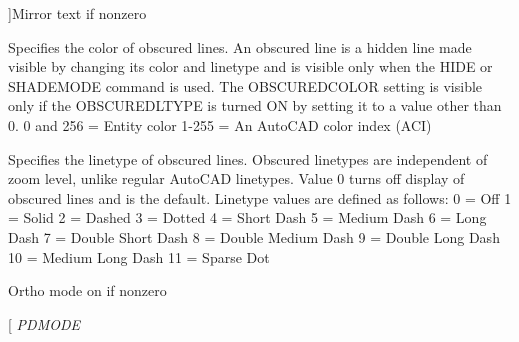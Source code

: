\begin{Desc}
\begin{description}
{}]Mirror text if nonzero \item[{\em 
O\+B\+S\+C\+O\+L\+OR\hypertarget{class_c_a_d_header_abd894aab7aa85b4c4634e67fb93d6886a2d78a3c49c635a923203efc313d1c968}{}\label{class_c_a_d_header_abd894aab7aa85b4c4634e67fb93d6886a2d78a3c49c635a923203efc313d1c968}
}]Specifies the color of obscured lines. An obscured line is a hidden line made visible by changing its color and linetype and is visible only when the H\+I\+DE or S\+H\+A\+D\+E\+M\+O\+DE command is used. The O\+B\+S\+C\+U\+R\+E\+D\+C\+O\+L\+OR setting is visible only if the O\+B\+S\+C\+U\+R\+E\+D\+L\+T\+Y\+PE is turned ON by setting it to a value other than 0. 0 and 256 = Entity color 1-\/255 = An Auto\+C\+AD color index (A\+CI) \item[{\em 
O\+B\+S\+L\+T\+Y\+PE\hypertarget{class_c_a_d_header_abd894aab7aa85b4c4634e67fb93d6886a716cfa454794e6a9b4b43faa7767b2c1}{}\label{class_c_a_d_header_abd894aab7aa85b4c4634e67fb93d6886a716cfa454794e6a9b4b43faa7767b2c1}
}]Specifies the linetype of obscured lines. Obscured linetypes are independent of zoom level, unlike regular Auto\+C\+AD linetypes. Value 0 turns off display of obscured lines and is the default. Linetype values are defined as follows\+: 0 = Off 1 = Solid 2 = Dashed 3 = Dotted 4 = Short Dash 5 = Medium Dash 6 = Long Dash 7 = Double Short Dash 8 = Double Medium Dash 9 = Double Long Dash 10 = Medium Long Dash 11 = Sparse Dot \item[{\em 
O\+R\+T\+H\+O\+M\+O\+DE\hypertarget{class_c_a_d_header_abd894aab7aa85b4c4634e67fb93d6886a20a2feb84bc2d160bd16202916b64e6b}{}\label{class_c_a_d_header_abd894aab7aa85b4c4634e67fb93d6886a20a2feb84bc2d160bd16202916b64e6b}
}]Ortho mode on if nonzero \item[{\em 
P\+D\+M\+O\+DE\hypertarget{class_c_a_d_header_abd894aab7aa85b4c4634e67fb93d6886aaf8996048afb6a49c007d0746a4ed309}{}\label{class_c_a_d_header_abd894aab7aa85b4c4634e67fb93d6886aaf8996048afb6a49c007d0746a4ed309}
}
\end{description}
\end{Desc}
